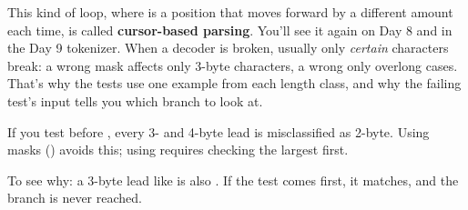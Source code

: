 \documentclass[10pt,a4paper]{article}
\begin{document}
This kind of loop, where  is a position that moves forward by a different amount each time, is called \textbf{cursor-based parsing}. You’ll see it again on Day 8 and in the Day 9 tokenizer. When a decoder is broken, usually only \emph{certain} characters break: a wrong mask affects only 3-byte characters, a wrong  only overlong cases. That’s why the tests use one example from each length class, and why the failing test’s input tells you which branch to look at.
\begin{trapbox}
If you test  before , every 3- and 4-byte lead is misclassified as 2-byte. Using masks () avoids this; using \code{\textgreater{}\allowbreak{}=\allowbreak{}} requires checking the largest first.
\end{trapbox}
To see why: a 3-byte lead like  is also . If the  test comes first, it matches, and the  branch is never reached.
\end{document}

